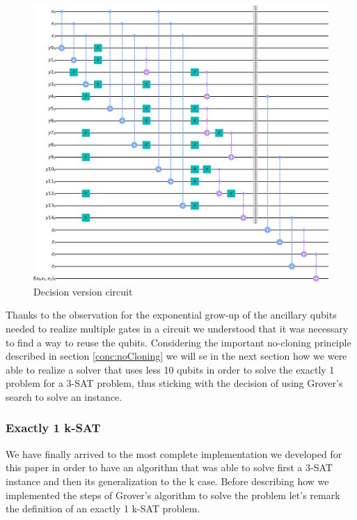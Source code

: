 \documentclass[english]{article}
\begin{document}
				\begin{figure}[h]
					\centering
					\includegraphics[scale=0.25]{DecisionCircuit}
					\caption{
						\label{fig:decisionVersionCircuit}
						Decision version circuit
					}
				\end{figure}
			
				Thanks to the observation for the exponential grow-up of the ancillary qubits needed to realize multiple gates in a circuit we understood that it was necessary to find a way to reuse the qubits. Considering the important no-cloning principle described in section \ref{conc:noCloning} we will se in the next section how we were able to realize a solver that uses less 10 qubits in order to solve the exactly 1 problem for a 3-SAT problem, thus sticking with the decision of using Grover's search to solve an instance.
			
			\subsubsection{Exactly 1 k-SAT}
			\label{sec:quantumExactlyOne}
				We have finally arrived to the most complete implementation we developed for this paper in order to have an algorithm that was able to solve first a 3-SAT instance and then its generalization to the k case. Before describing how we implemented the steps of Grover's algorithm to solve the problem let's remark the definition of an exactly 1 k-SAT problem.
				
\end{document}
